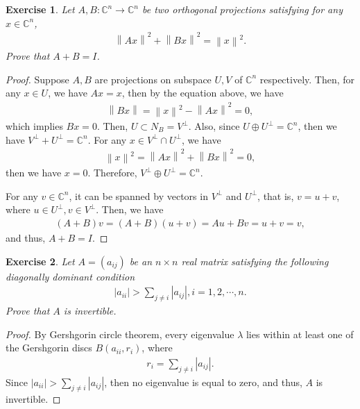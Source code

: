 \documentclass[11pt]{article}
\newtheorem{exercise}{Exercise}[section]
\theoremstyle{definition}
\numberwithin{equation}{subsection}
\begin{document}
\begin{exercise}{\rm *}
Let $A, B: \mathbb{C}^n \to \mathbb{C}^n$ be two orthogonal projections satisfying for any $x \in \mathbb{C}^n$,
\begin{align*}
    \left\|Ax\right\|^2 + \left\|Bx\right\|^2 = \left\|x\right\|^2.
\end{align*}
Prove that $A + B = I$.
\end{exercise}
\begin{proof}
Suppose $A, B$ are projections on subspace $U, V$ of $\mathbb{C}^n$ respectively. Then, for any $x \in U$, we have $Ax = x$, then by the equation above, we have
\begin{align*}
    \left\|Bx\right\| = \left\|x\right\|^2 - \left\|Ax\right\|^2 = 0,
\end{align*}
which implies $Bx = 0$. Then, $U \subset N_B = V^\bot$. Also, since $U \oplus U^\bot = \mathbb{C}^n$, then we have $V^\bot + U^\bot = \mathbb{C}^n$. For any $x \in V^\bot \cap U^\bot$, we have
\begin{align*}
    \left\|x\right\|^2 = \left\|Ax\right\|^2 + \left\|Bx\right\|^2 = 0,
\end{align*}
then we have $x = 0$. Therefore, $V^\bot \oplus U^\bot = \mathbb{C}^n$. 

For any $v \in \mathbb{C}^n$, it can be spanned by vectors in $V^\bot$ and $U^\bot$, that is, $v = u + v$, where $u \in U^\bot, v \in V^\bot$. Then, we have
\begin{align*}
    (A + B)v = (A + B)(u + v) = Au + Bv = u + v = v,
\end{align*}
and thus, $A + B = I$.
\end{proof}

\medskip

\begin{exercise}{\rm *}
Let $A = (a_{ij})$ be an $n \times n$ real matrix satisfying the following diagonally dominant condition
\begin{align*}
    \left|a_{ii}\right| > \sum_{j \neq i} \left|a_{ij}\right|, i = 1, 2, \cdots, n.
\end{align*}
Prove that $A$ is invertible.
\end{exercise}
\begin{proof}
By Gershgorin circle theorem, every eigenvalue $\lambda$ lies within at least one of the Gershgorin discs $\displaystyle B\left(a_{ii}, r_i\right)$, where 
\begin{align*}
    r_i = \sum_{j\neq i}\left|a_{ij}\right|.
\end{align*}
Since $\displaystyle \left|a_{ii}\right| > \sum_{j \neq i} \left|a_{ij}\right|$, then no eigenvalue is equal to zero, and thus, $A$ is invertible.
\end{proof}
\end{document}
